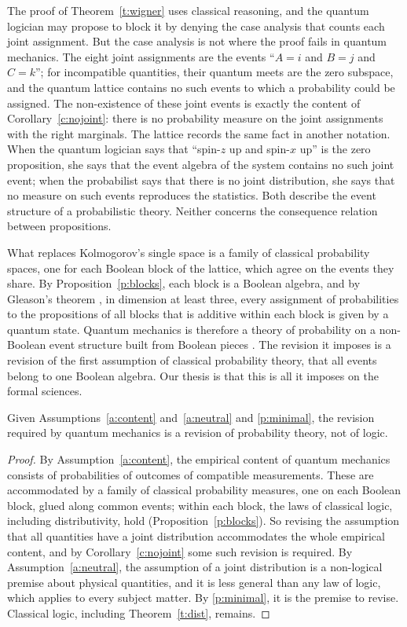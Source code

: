 \documentclass{situationist-preprint}
\begin{document}
The proof of Theorem~\ref{t:wigner} uses classical reasoning, and the quantum logician may propose to block it by denying the case analysis that counts each joint assignment. But the case analysis is not where the proof fails in quantum mechanics. The eight joint assignments are the events \enquote{$A = i$ and $B = j$ and $C = k$}; for incompatible quantities, their quantum meets are the zero subspace, and the quantum lattice contains no such events to which a probability could be assigned. The non-existence of these joint events is exactly the content of Corollary~\ref{c:nojoint}: there is no probability measure on the joint assignments with the right marginals. The lattice records the same fact in another notation. When the quantum logician says that \enquote{spin-$z$ up and spin-$x$ up} is the zero proposition, she says that the event algebra of the system contains no such joint event; when the probabilist says that there is no joint distribution, she says that no measure on such events reproduces the statistics. Both describe the event structure of a probabilistic theory. Neither concerns the consequence relation between propositions.

What replaces Kolmogorov's single space is a family of classical probability spaces, one for each Boolean block of the lattice, which agree on the events they share. By Proposition~\ref{p:blocks}, each block is a Boolean algebra, and by Gleason's theorem \citep{Gleason1957}, in dimension at least three, every assignment of probabilities to the propositions of all blocks that is additive within each block is given by a quantum state. Quantum mechanics is therefore a theory of probability on a non-Boolean event structure built from Boolean pieces \citep{Pitowsky2006}. The revision it imposes is a revision of the first assumption of classical probability theory, that all events belong to one Boolean algebra. Our thesis is that this is all it imposes on the formal sciences.

\begin{theorem}\label{t:location}
Given Assumptions~\ref{a:content} and~\ref{a:neutral} and \ref{p:minimal}, the revision required by quantum mechanics is a revision of probability theory, not of logic.
\end{theorem}

\begin{proof}
By Assumption~\ref{a:content}, the empirical content of quantum mechanics consists of probabilities of outcomes of compatible measurements. These are accommodated by a family of classical probability measures, one on each Boolean block, glued along common events; within each block, the laws of classical logic, including distributivity, hold (Proposition~\ref{p:blocks}). So revising the assumption that all quantities have a joint distribution accommodates the whole empirical content, and by Corollary~\ref{c:nojoint} some such revision is required. By Assumption~\ref{a:neutral}, the assumption of a joint distribution is a non-logical premise about physical quantities, and it is less general than any law of logic, which applies to every subject matter. By \ref{p:minimal}, it is the premise to revise. Classical logic, including Theorem~\ref{t:dist}, remains.
\end{proof}
\end{document}
